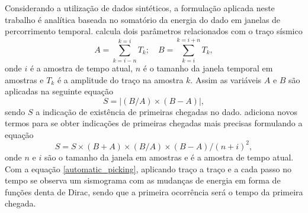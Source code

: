 Considerando a utilização de dados sintéticos, a formulação aplicada neste trabalho é analítica baseada no somatório da energia do dado em janelas de percorrimento temporal.  calcula dois parâmetros relacionados com o traço sísmico 
\begin{equation}
	A = \displaystyle\sum_{k=i-n}^{k=i} T_k;\,\,\,\,\,\, B = \displaystyle\sum_{k=i}^{k=i+n} T_k, 
\end{equation} 
\noindent onde $i$ é a amostra de tempo atual, $n$ é o tamanho da janela temporal em amostras e $T_k$ é a amplitude do traço na amostra $k$. Assim as variáveis $A$ e $B$ são aplicadas na seguinte equação
\begin{equation}
	S = |(B / A)\times(B - A)|,
\end{equation} 
\noindent sendo $S$ a indicação de existência de primeiras chegadas no dado.  adiciona novos termos para se obter indicações de primeiras chegadas mais precisas formulando a equação
\begin{equation}
	S = S\times(B + A)\times(B/A)\times(B-A)/(n+i)^2, 
	\label{automatic_picking}
\end{equation}
\noindent onde $n$ e $i$ são o tamanho da janela em amostras e é a amostra de tempo atual. Com a equação \ref{automatic_picking}, aplicando traço a traço e a cada passo no tempo se observa um sismograma com as mudanças de energia em forma de funções denta de Dirac, sendo que a primeira ocorrência será o tempo da primeira chegada.   